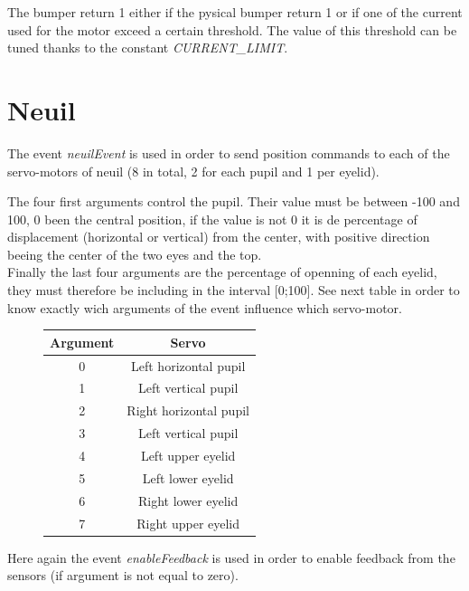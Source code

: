 \documentclass[a4paper,11pt]{report}
\begin{document}
The bumper return 1 either if the pysical bumper return 1 or if one of the current used for the motor exceed a certain threshold. The value of this threshold can be tuned thanks to the constant \textit{CURRENT\_LIMIT}.

\section{Neuil}

The event \textit{neuilEvent} is used in order to send position commands to each of the servo-motors of neuil (8 in total, 2 for each pupil and 1 per eyelid).

The four first arguments control the pupil. Their value must be between -100 and 100, 0 been the central position, if the value is not 0 it is de percentage of displacement (horizontal or vertical) from the center, with positive direction beeing the center of the two eyes and the top.\\ 

Finally the last four arguments are the percentage of openning of each eyelid, they must therefore be including in the interval [0;100]. See next table in order to know exactly wich arguments of the event influence which servo-motor.\\

\begin{figure}[H]
\begin{center}
\begin{tabular}{|c|c|}
   \hline
   \textbf{Argument} & \textbf{Servo}\\
   \hline
   \hline
   0 & Left horizontal pupil\\
   \hline
   1 & Left vertical pupil\\
   \hline
   2 & Right horizontal pupil\\
   \hline
   3 & Left vertical pupil\\
   \hline
   4 & Left upper eyelid\\
   \hline
   5 & Left lower eyelid\\
   \hline
   6 & Right lower eyelid\\
   \hline
   7 & Right upper eyelid\\
   \hline
\end{tabular}
\end{center}
\end{figure}

Here again the event \textit{enableFeedback} is used in order to enable feedback from the sensors (if argument is not equal to zero).\\
\end{document}
